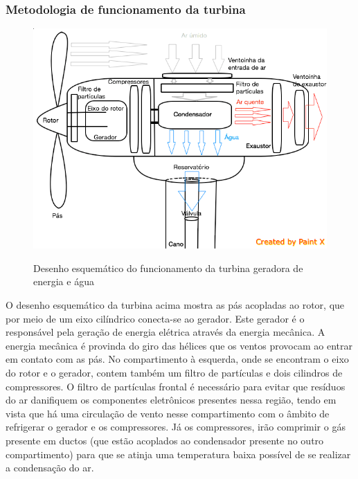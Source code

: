 \subsubsection{Metodologia de funcionamento da turbina}
\FloatBarrier
\begin{figure}[!h]
      \centering
      \includegraphics[scale = 0.9]{editaveis/figuras/funcionamento_turbina}
      \label{funcionamento_turbina}
      \caption[Funcionamento da turbina]{Desenho esquemático do funcionamento da turbina geradora de energia e água}
    \end{figure}
    \FloatBarrier
    
    O desenho esquemático da turbina acima mostra as pás acopladas ao rotor, que por meio de um eixo cilíndrico conecta-se ao gerador. Este gerador é o responsável pela geração de energia elétrica através da energia mecânica. A energia mecânica é provinda do giro das hélices que os ventos provocam ao entrar em contato com as pás.  No compartimento à esquerda, onde se encontram o eixo do rotor e o gerador, contem também um filtro de partículas e dois cilindros de compressores. O filtro de partículas frontal é necessário para evitar que resíduos do ar danifiquem os componentes eletrônicos presentes nessa região, tendo em vista que há uma circulação de vento nesse compartimento com o âmbito de refrigerar o gerador e os compressores. Já os compressores, irão comprimir o gás presente em ductos (que estão acoplados ao condensador presente no outro compartimento) para que se atinja uma temperatura baixa possível de se realizar a condensação do ar.

